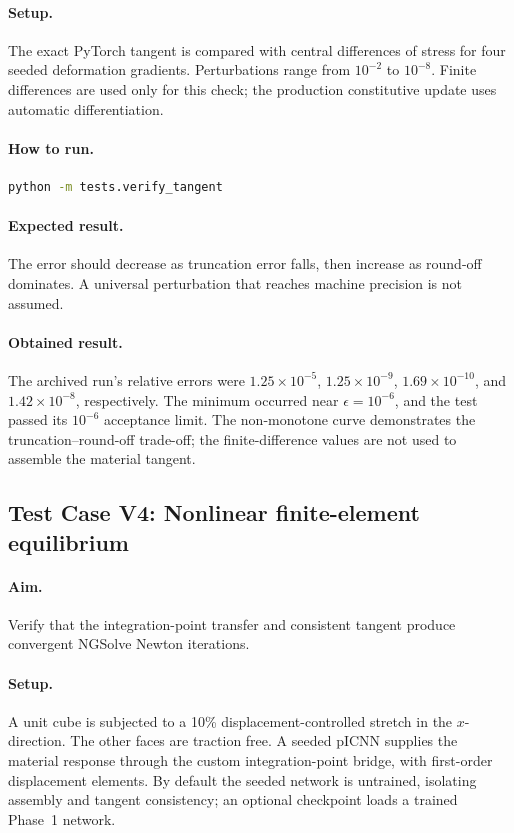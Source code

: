 \paragraph{Setup.}
The exact PyTorch tangent is compared with central differences of stress for
four seeded deformation gradients. Perturbations range from \(10^{-2}\) to
\(10^{-8}\). Finite differences are used only for this check; the production
constitutive update uses automatic differentiation.

\paragraph{How to run.}
\begin{lstlisting}[language=bash]
python -m tests.verify_tangent
\end{lstlisting}

\paragraph{Expected result.}
The error should decrease as truncation error falls, then increase as
round-off dominates. A universal perturbation that reaches machine precision
is not assumed.

\paragraph{Obtained result.}
The archived run's relative errors were \(1.25\times10^{-5}\),
\(1.25\times10^{-9}\), \(1.69\times10^{-10}\), and
\(1.42\times10^{-8}\), respectively. The minimum occurred near
\(\epsilon=10^{-6}\), and the test passed its \(10^{-6}\) acceptance limit.
The non-monotone curve demonstrates the truncation--round-off trade-off; the
finite-difference values are not used to assemble the material tangent.

\subsection*{Test Case V4: Nonlinear finite-element equilibrium}
\paragraph{Aim.}
Verify that the integration-point transfer and consistent tangent produce
convergent NGSolve Newton iterations.

\paragraph{Setup.}
A unit cube is subjected to a 10\% displacement-controlled stretch in the
\(x\)-direction. The other faces are traction free. A seeded pICNN supplies
the material response through the custom integration-point bridge, with
first-order displacement elements. By default the seeded network is
untrained, isolating assembly and tangent consistency; an optional checkpoint
loads a trained Phase~1 network.

